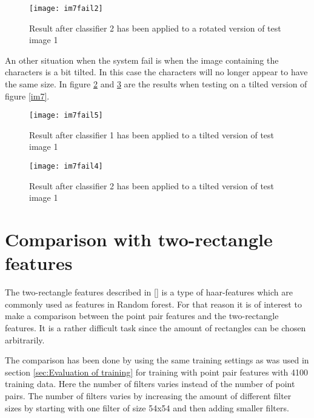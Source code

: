 \begin{figure}[H]
\centering
	\texttt{[image: im7fail2]}
	\caption{Result after classifier 2 has been applied to a rotated version of test image 1}
	\label{im7fail3}
\end{figure}

An other situation when the system fail is when the image containing the characters is a bit tilted. In this case the characters will no longer appear to have the same size. In figure \ref{im7fail5} and \ref{im7fail4} are the results when testing on a tilted version of figure \ref{im7}.

\begin{figure}[H]
\centering
	\texttt{[image: im7fail5]}
	\caption{Result after classifier 1 has been applied to a tilted version of test image 1}
	\label{im7fail5}
\end{figure}

\begin{figure}[H]
\centering
	\texttt{[image: im7fail4]}
	\caption{Result after classifier 2 has been applied to a tilted version of test image 1}
	\label{im7fail4}
\end{figure}


\section{Comparison with two-rectangle features}
\label{sec:Comparison with two-rectangle features}
The two-rectangle features described in \ref{} is a type of haar-features which are commonly used as features in Random forest. For that reason it is of interest to make a comparison between the point pair features and the two-rectangle features. It is a rather difficult task since the amount of rectangles can be chosen arbitrarily. 

The comparison has been done by using the same training settings as was used in section \ref{sec:Evaluation of training} for training with point pair features with 4100 training data. Here the number of filters varies instead of the number of point pairs. The number of filters varies by increasing the amount of different filter sizes by starting with one filter of size 54x54 and then adding smaller filters.

